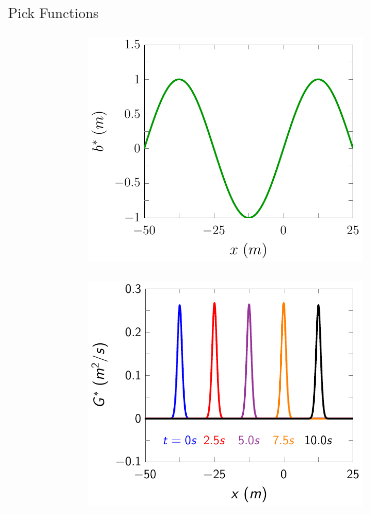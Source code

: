 \documentclass[pdf]{beamer}
\begin{document}
\begin{frame}{Pick Functions}
\begin{figure}
\begin{subfigure}{0.5\textwidth}
	\end{subfigure}
	\begin{subfigure}{0.5\textwidth}
		\includegraphics[width=0.8\textwidth]{./Pics/DryBed/Forced/binitial.pdf}
	\end{subfigure}%
	\begin{subfigure}{0.5\textwidth}
		\includegraphics[width=0.8\textwidth]{./Pics/DryBed/Forced/G.pdf}
	\end{subfigure}
\end{figure}
	
\end{frame}
\end{document}

